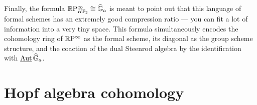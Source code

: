 Finally, the formula $\mathbb R\mathrm P^\infty_{H\mathbb F_2} \cong \widehat{\mathbb G}_a$ is meant to point out that this language of formal schemes has an extremely good compression ratio --- you can fit a lot of information into a very tiny space.  This formula simultaneously encodes the cohomology ring of $\mathbb R\mathrm P^\infty$ as the formal scheme, its diagonal as the group scheme structure, and the coaction of the dual Steenrod algebra by the identification with $\operatorname{\underline{\smash{\operatorname{Aut}}}}{\widehat{\mathbb G}_a}$.







\section{Hopf algebra cohomology}\label{HopfAlgebraLecture}


